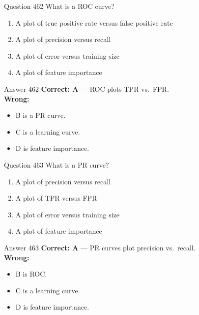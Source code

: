 \documentclass[aspectratio=169,11pt]{beamer}
\begin{document}
	\begin{frame}{Question 462}
		What is a ROC curve?
		\begin{enumerate}[label=\Alph*.]
			\item A plot of true positive rate versus false positive rate
			\item A plot of precision versus recall
			\item A plot of error versus training size
			\item A plot of feature importance
		\end{enumerate}
	\end{frame}
	\begin{frame}{Answer 462}
		\textbf{Correct: A} --- ROC plots TPR vs.\ FPR.\\
		\vspace{0.5em}
		\textbf{Wrong:}
		\begin{itemize}
			\item B is a PR curve.
			\item C is a learning curve.
			\item D is feature importance.
		\end{itemize}
	\end{frame}
	
	\begin{frame}{Question 463}
		What is a PR curve?
		\begin{enumerate}[label=\Alph*.]
			\item A plot of precision versus recall
			\item A plot of TPR versus FPR
			\item A plot of error versus training size
			\item A plot of feature importance
		\end{enumerate}
	\end{frame}
	\begin{frame}{Answer 463}
		\textbf{Correct: A} --- PR curves plot precision vs.\ recall.\\
		\vspace{0.5em}
		\textbf{Wrong:}
		\begin{itemize}
			\item B is ROC.
			\item C is a learning curve.
			\item D is feature importance.
		\end{itemize}
	\end{frame}
	
\end{document}
